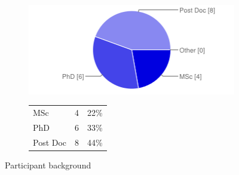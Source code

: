 \documentclass[MSc,paper=a4,pagesize=auto]{icldt}
\begin{document}
\begin{figure}[htbp!]
\centering
\begin{subfigure}{0.4\linewidth}
    \centering
    \includegraphics[width=1\linewidth]{resources/1-status}
\end{subfigure}%
\centering
\begin{subfigure}{\textwidth}
    \centering
   	\begin{tabular}{ l c r }
   	MSc      & 4 & 22\% \\
  	PhD      & 6 & 33\% \\
	Post Doc	 & 8 & 44\% \\
\end{tabular}
\end{subfigure} 
    \caption{Participant background}
    \label{fig:1-status}
\end{figure}
\end{document}

